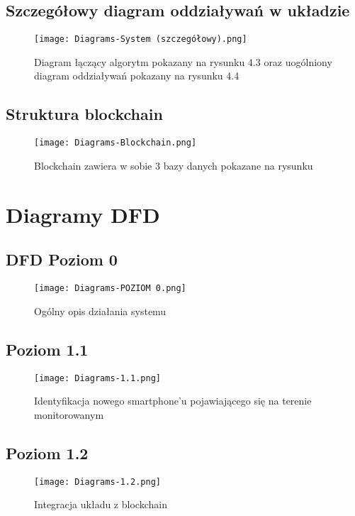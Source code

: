 \documentclass{article}
\begin{document}
\subsection{Szczegółowy diagram oddziaływań w układzie}
\begin{figure}[!htb]
\centering
\texttt{[image: Diagrams-System (szczegółowy).png]}
\caption{Diagram łączący algorytm pokazany na rysunku 4.3 oraz uogólniony diagram oddziaływań pokazany na rysunku 4.4}
\end{figure}
\FloatBarrier

\subsection{Struktura blockchain}
\begin{figure}[!htb]
\centering
\texttt{[image: Diagrams-Blockchain.png]}
\caption{Blockchain zawiera w sobie 3 bazy danych pokazane na rysunku}
\end{figure}
\FloatBarrier
\clearpage
\section{Diagramy DFD} 

\subsection{DFD Poziom 0}
\begin{figure}[!htb]
\centering
\texttt{[image: Diagrams-POZIOM 0.png]}
\caption{Ogólny opis działania systemu}
\end{figure}
\FloatBarrier

\subsection{Poziom 1.1}
\begin{figure}[!htb]
\centering
\texttt{[image: Diagrams-1.1.png]}
\caption{Identyfikacja nowego smartphone'u pojawiającego się na terenie monitorowanym}
\end{figure}
\FloatBarrier
\clearpage

\subsection{Poziom 1.2}
\begin{figure}[!htb]
\centering
\texttt{[image: Diagrams-1.2.png]}
\caption{Integracja układu z blockchain}
\end{figure}
\end{document}
